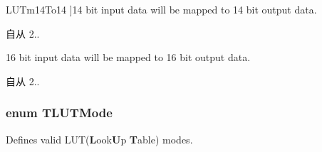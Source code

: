 \begin{Desc}
\begin{description}
{\hypertarget{group___common_interface_gga161dbf21975385f4cd6bd555fd39298ca1a16ff6b79c3ef3813d2a2798e2fc07f}{L\+U\+Tm14\+To14}\label{group___common_interface_gga161dbf21975385f4cd6bd555fd39298ca1a16ff6b79c3ef3813d2a2798e2fc07f}
}]14 bit input data will be mapped to 14 bit output data. \begin{DoxySince}{自从}
2.. 
\end{DoxySince}
\item[{\em 
\hypertarget{group___common_interface_gga161dbf21975385f4cd6bd555fd39298ca9fb50985fe1a3020d09cbc15d5410e55}{L\+U\+Tm16\+To16}\label{group___common_interface_gga161dbf21975385f4cd6bd555fd39298ca9fb50985fe1a3020d09cbc15d5410e55}
}]16 bit input data will be mapped to 16 bit output data. \begin{DoxySince}{自从}
2.. 
\end{DoxySince}
\end{description}
\end{Desc}
\hypertarget{group___common_interface_ga622d4fe4aa7b262752e9101c78f87f57}{
\subsubsection[{T\+L\+U\+T\+Mode}]{\setlength{\rightskip}{0pt plus 5cm}enum {\bf T\+L\+U\+T\+Mode}}}\label{group___common_interface_ga622d4fe4aa7b262752e9101c78f87f57}


Defines valid L\+U\+T({\bfseries L}ook{\bfseries U}p {\bfseries T}able) modes. 

